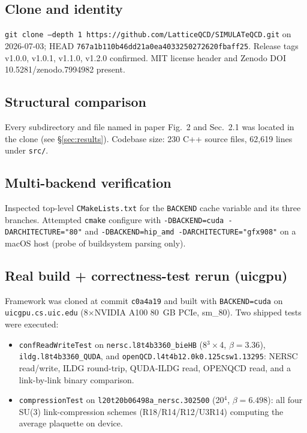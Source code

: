 \documentclass[11pt]{article}
\begin{document}
\subsection{Clone and identity}
\texttt{git clone --depth 1 https://github.com/LatticeQCD/SIMULATeQCD.git} on 2026-07-03; HEAD \texttt{767a1b110b46dd21a0ea4033250272620fbaff25}. Release tags v1.0.0, v1.0.1, v1.1.0, v1.2.0 confirmed. MIT license header and Zenodo DOI 10.5281/zenodo.7994982 present.

\subsection{Structural comparison}
Every subdirectory and file named in paper Fig.~2 and Sec.~2.1 was located in the clone (see \S\ref{sec:results}). Codebase size: 230 C++ source files, 62{,}619 lines under \texttt{src/}.

\subsection{Multi-backend verification}
Inspected top-level \texttt{CMakeLists.txt} for the \texttt{BACKEND} cache variable and its three branches. Attempted \texttt{cmake} configure with \texttt{-DBACKEND=cuda -DARCHITECTURE="80"} and \texttt{-DBACKEND=hip\_amd -DARCHITECTURE="gfx908"} on a macOS host (probe of buildsystem parsing only).

\subsection{Real build + correctness-test rerun (uicgpu)}
Framework was cloned at commit \texttt{c0a4a19} and built with \texttt{BACKEND=cuda} on \texttt{uicgpu.cs.uic.edu} (8$\times$NVIDIA A100 80~GB PCIe, sm\_80). Two shipped tests were executed:
\begin{itemize}[leftmargin=1.5em]
  \item \texttt{confReadWriteTest} on \texttt{nersc.l8t4b3360\_bieHB} (8$^3\times$4, $\beta{=}3.36$), \texttt{ildg.l8t4b3360\_QUDA}, and \texttt{openQCD.l4t4b12.0k0.125csw1.13295}: NERSC read/write, ILDG round-trip, QUDA-ILDG read, OPENQCD read, and a link-by-link binary comparison.
  \item \texttt{compressionTest} on \texttt{l20t20b06498a\_nersc.302500} (20$^4$, $\beta{=}6.498$): all four SU(3) link-compression schemes (R18/R14/R12/U3R14) computing the average plaquette on device.
\end{itemize}
\end{document}
